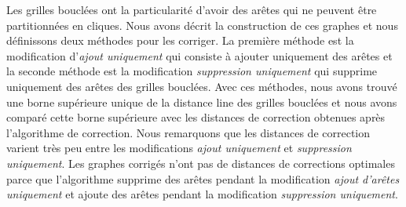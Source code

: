 
Les grilles boucl\'ees ont la particularit\'e d'avoir des ar\^etes qui ne peuvent \^etre partitionn\'ees en cliques. 
Nous avons d\'ecrit la construction de ces graphes et nous d\'efinissons deux m\'ethodes pour les corriger. La premi\`ere m\'ethode est la modification d'{\em ajout uniquement} qui consiste \`a ajouter uniquement des ar\^etes  et la seconde m\'ethode est la modification {\em suppression uniquement} qui supprime uniquement des ar\^etes des grilles boucl\'ees. 
Avec ces m\'ethodes, nous avons trouv\'e une borne sup\'erieure unique de la distance line des  grilles boucl\'ees et nous avons compar\'e cette borne sup\'erieure avec les distances de correction obtenues apr\`es l'algorithme de correction.
\newline
Nous remarquons que les distances de correction varient tr\`es peu entre les modifications {\em ajout uniquement} et {\em suppression uniquement}.  Les graphes corrig\'es n'ont pas de distances de corrections optimales parce que l'algorithme supprime des ar\^etes pendant la modification {\em ajout d'ar\^etes uniquement} et ajoute des ar\^etes pendant la modification {\em suppression uniquement}.  

